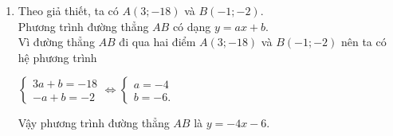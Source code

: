 \begin{ex}
{\begin{enumerate}
\begin{center}
        				\end{center}
        	\item Theo giả thiết, ta có $A(3; -18)$ và $B(-1; -2)$.\\
        			Phương trình đường thẳng $AB$ có dạng $y = ax + b$.\\
        			Vì đường thẳng $AB$ đi qua hai điểm $A(3; -18)$ và $B(-1; -2)$ nên ta có hệ phương trình
        			\begin{center}
        				$\begin{cases} 3a + b = -18 \\ -a + b = -2 \end{cases} \Leftrightarrow \begin{cases} a = -4 \\ b = -6. \end{cases}$\\			
        			\end{center}
        			Vậy phương trình đường thẳng $AB$ là $y = -4x - 6$.
		\end{enumerate}
	}
\end{ex}

